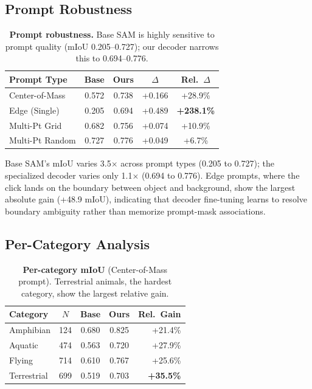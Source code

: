 \subsection{Prompt Robustness}

\begin{table}[t]
\centering
\caption{\textbf{Prompt robustness.} Base SAM is highly sensitive to prompt quality (mIoU 0.205--0.727); our decoder narrows this to 0.694--0.776.}
\label{tab:improvement}
\small
\begin{tabular}{lcccc}
\toprule
Prompt Type & Base & Ours & $\Delta$ & Rel.~$\Delta$ \\
\midrule
Center-of-Mass & 0.572 & 0.738 & +0.166 & +28.9\% \\
Edge (Single) & 0.205 & 0.694 & +0.489 & \textbf{+238.1\%} \\
Multi-Pt Grid & 0.682 & 0.756 & +0.074 & +10.9\% \\
Multi-Pt Random & 0.727 & 0.776 & +0.049 & +6.7\% \\
\bottomrule
\end{tabular}
\end{table}

Base SAM's mIoU varies 3.5$\times$ across prompt types (0.205 to 0.727); the specialized decoder varies only 1.1$\times$ (0.694 to 0.776). Edge prompts, where the click lands on the boundary between object and background, show the largest absolute gain (+48.9 mIoU), indicating that decoder fine-tuning learns to resolve boundary ambiguity rather than memorize prompt-mask associations.

\subsection{Per-Category Analysis}

\begin{table}[t]
\centering
\caption{\textbf{Per-category mIoU} (Center-of-Mass prompt). Terrestrial animals, the hardest category, show the largest relative gain.}
\label{tab:category}
\small
\begin{tabular}{lcccr}
\toprule
Category & $N$ & Base & Ours & Rel.~Gain \\
\midrule
Amphibian & 124 & 0.680 & 0.825 & +21.4\% \\
Aquatic & 474 & 0.563 & 0.720 & +27.9\% \\
Flying & 714 & 0.610 & 0.767 & +25.6\% \\
Terrestrial & 699 & 0.519 & 0.703 & \textbf{+35.5\%} \\
\bottomrule
\end{tabular}
\end{table}

